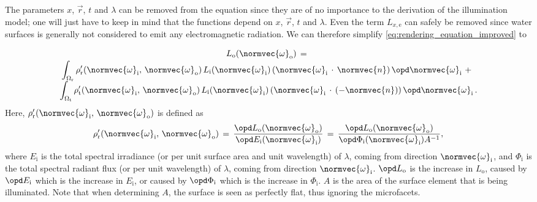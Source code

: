 The parameters $x$, $\vec{r}$, $t$ and $\lambda$ can be removed from the equation since they are of no importance to the derivation of the illumination model; one will just have to keep in mind that the functions depend on $x$, $\vec{r}$, $t$ and $\lambda$. Even the term $L_{x, \text{e}}$ can safely be removed since water surfaces is generally not considered to emit any electromagnetic radiation. We can therefore simplify \eqref{eq:rendering_equation_improved} to
%
\begin{equation} \label{eq:rendering_equation_reduced_rhor_rhot}
\renewcommand*{\arraystretch}{1.5}
\begin{array}{cl}
L_{\text{o}}(\normvec{\omega}_{\text{o}}) \,= \\
\displaystyle \int_{\Omega_{\text{r}}} \rho'_{\text{r}}(\normvec{\omega}_{\text{i}},\, \normvec{\omega}_{\text{o}})\, L_{\text{i}}(\normvec{\omega}_{\text{i}})\, (\normvec{\omega}_{\text{i}}\,\cdot\,\normvec{n})\, \opd \normvec{\omega}_{\text{i}} \ + \\[1ex]
\displaystyle \int_{\Omega_{\text{t}}} \rho'_{\text{t}}(\normvec{\omega}_{\text{i}},\, \normvec{\omega}_{\text{o}})\, L_{\text{i}}(\normvec{\omega}_{\text{i}})\, (\normvec{\omega}_{\text{i}}\,\cdot\,(-\normvec{n}))\, \opd \normvec{\omega}_{\text{i}} & \!\!\!\!\! .
\end{array}
\end{equation}
%
Here, $\rho'_{\text{r}}(\normvec{\omega}_{\text{i}},\, \normvec{\omega}_{\text{o}})$ is defined as
%
\begin{equation} \label{eq:brdf_definition}
\rho'_{\text{r}}(\normvec{\omega}_{\text{i}},\, \normvec{\omega}_{\text{o}}) \,=\, \frac{\opd L_{\text{o}}(\normvec{\omega}_{\text{o}})}{\opd E_{\text{i}}(\normvec{\omega}_{\text{i}})} \,=\, \frac{\opd L_{\text{o}}(\normvec{\omega}_{\text{o}})}{\opd \Phi_{\text{i}}(\normvec{\omega}_{\text{i}})A^{-1}},
\end{equation}
%
where $E_{\text{i}}$ is the total spectral irradiance (or  per unit surface area and unit wavelength) of  $\lambda$, coming from direction $\normvec{\omega}_{\text{i}}$, and $\Phi_{\text{i}}$ is the total spectral radiant flux (or  per unit wavelength) of  $\lambda$, coming from direction $\normvec{\omega}_{\text{i}}$. $\opd L_{\text{o}}$ is the \infinitesimal increase in $L_{\text{o}}$, caused by $\opd E_{\text{i}}$ which is the \infinitesimal increase in $E_{\text{i}}$, or caused by $\opd \Phi_{\text{i}}$ which is the \infinitesimal increase in $\Phi_{\text{i}}$. %
$A$ is the area of the surface element that is being illuminated. Note that when determining $A$, the surface is seen as perfectly flat, thus ignoring the microfacets.

